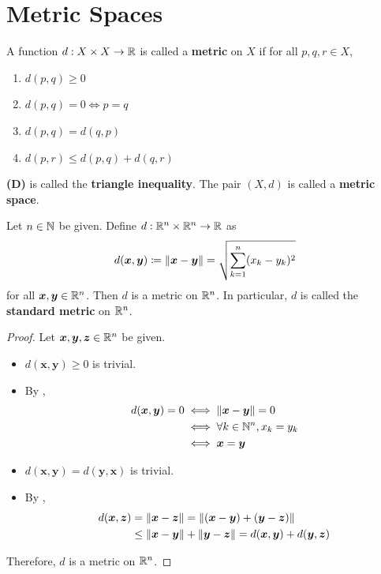 \section{Metric Spaces}

A function $d: X \times X \to \R$ is called a \textbf{metric} on $X$ if for all $p, q, r \in X$,
\begin{enumerate}[label=\textbf{(\Alph*)}]
    \item $d(p, q) \geq 0$
    \item $d(p, q) = 0 \iff p = q$
    \item $d(p, q) = d(q, p)$
    \item $d(p, r) \leq d(p, q) + d(q, r)$
\end{enumerate}
\textbf{(D)} is called the \textbf{triangle inequality}. The pair $(X, d)$ is called a \textbf{metric space}.

\bigskip

\begin{theorem} \label{an:thm:standard-metric-on-rn}
    Let $n \in \N$ be given. Define $d: \R^{n} \times \R^{n} \to \R$ as
    \[
    d(\bm{x}, \bm{y}) \coloneqq \norm*{\bm{x} - \bm{y}} = \sqrt{\sum_{k = 1}^{n} (x_{k} - y_{k})^{2}}
    \]
    for all $\bm{x}, \bm{y} \in \R^{n}$. Then $d$ is a metric on $\R^{n}$.
    In particular, $d$ is called the \textbf{standard metric} on $\R^{n}$.
\end{theorem}

\begin{proof}
    Let $\bm{x}, \bm{y}, \bm{z} \in \R^{n}$ be given.
    \begin{itemize}
        \item $d(\bm{x}, \bm{y}) \geq 0$ is trivial.
        \item By ,
        \begin{align*}
            d(\bm{x}, \bm{y}) = 0 &\iff \norm*{\bm{x} - \bm{y}} = 0 \\
            &\iff \forall k \in \N^{n}, x_{k} = y_{k} \\
            &\iff \bm{x} = \bm{y}
        \end{align*}
        \item $d(\bm{x}, \bm{y}) = d(\bm{y}, \bm{x})$ is trivial.
        \item By ,
        \begin{align*}
            d(\bm{x}, \bm{z}) &= \norm*{\bm{x} - \bm{z}} =
            \norm*{(\bm{x} - \bm{y}) + (\bm{y} - \bm{z})} \\
            &\leq \norm*{\bm{x} - \bm{y}} + \norm*{\bm{y} - \bm{z}}
            = d(\bm{x},\bm{y}) + d(\bm{y},\bm{z})
        \end{align*}
    \end{itemize}
    Therefore, $d$ is a metric on $\R^{n}$.
\end{proof}

